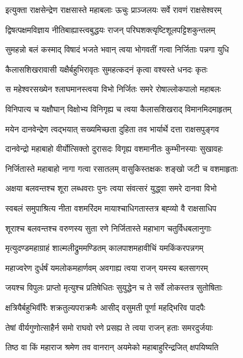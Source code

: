 
\twolineshloka
{इत्युक्ता राक्षसेन्द्रेण राक्षसास्ते महाबलाः}
{ऊचुः प्राञ्जलयः सर्वे रावणं राक्षसेश्वरम्} %

\twolineshloka
{द्विषत्पक्षमविज्ञाय नीतिबाह्यास्त्वबुद्धयः}
{राजन् परिघशक्त्यृष्टिशूलपट्टिशकुन्तलम्} %

\twolineshloka
{सुमहन्नो बलं कस्माद् विषादं भजते भवान्}
{त्वया भोगवतीं गत्वा निर्जिताः पन्नगा युधि} %

\twolineshloka
{कैलासशिखरावासी यक्षैर्बहुभिरावृतः}
{सुमहत्कदनं कृत्वा वश्यस्ते धनदः कृतः} %

\twolineshloka
{स महेश्वरसख्येन श्लाघमानस्त्वया विभो}
{निर्जितः समरे रोषाल्लोकपालो महाबलः} %

\twolineshloka
{विनिपात्य च यक्षौघान् विक्षोभ्य विनिगृह्य च}
{त्वया कैलासशिखराद् विमानमिदमाहृतम्} %

\twolineshloka
{मयेन दानवेन्द्रेण त्वद्भयात् सख्यमिच्छता}
{दुहिता तव भार्यार्थे दत्ता राक्षसपुङ्गव} %

\twolineshloka
{दानवेन्द्रो महाबाहो वीर्योत्सिक्तो दुरासदः}
{विगृह्य वशमानीतः कुम्भीनस्याः सुखावहः} %

\twolineshloka
{निर्जितास्ते महाबाहो नागा गत्वा रसातलम्}
{वासुकिस्तक्षकः शङ्खो जटी च वशमाहृताः} %

\twolineshloka
{अक्षया बलवन्तश्च शूरा लब्धवराः पुनः}
{त्वया संवत्सरं युद्ध्वा समरे दानवा विभो} %

\twolineshloka
{स्वबलं समुपाश्रित्य नीता वशमरिंदम}
{मायाश्चाधिगतास्तत्र बह्व्यो वै राक्षसाधिप} %

\twolineshloka
{शूराश्च बलवन्तश्च वरुणस्य सुता रणे}
{निर्जितास्ते महाभाग चतुर्विधबलानुगाः} %

\twolineshloka
{मृत्युदण्डमहाग्राहं शाल्मलीद्रुममण्डितम्}
{कालपाशमहावीचिं यमकिंकरपन्नगम्} %

\twolineshloka
{महाज्वरेण दुर्धर्षं यमलोकमहार्णवम्}
{अवगाह्य त्वया राजन् यमस्य बलसागरम्} %

\twolineshloka
{जयश्च विपुलः प्राप्तो मृत्युश्च प्रतिषेधितः}
{सुयुद्धेन च ते सर्वे लोकस्तत्र सुतोषिताः} %

\twolineshloka
{क्षत्रियैर्बहुभिर्वीरैः शक्रतुल्यपराक्रमैः}
{आसीद् वसुमती पूर्णा महद्भिरिव पादपैः} %

\twolineshloka
{तेषां वीर्यगुणोत्साहैर्न समो राघवो रणे}
{प्रसह्य ते त्वया राजन् हताः समरदुर्जयाः} %

\twolineshloka
{तिष्ठ वा किं महाराज श्रमेण तव वानरान्}
{अयमेको महाबाहुरिन्द्रजित् क्षपयिष्यति} %

